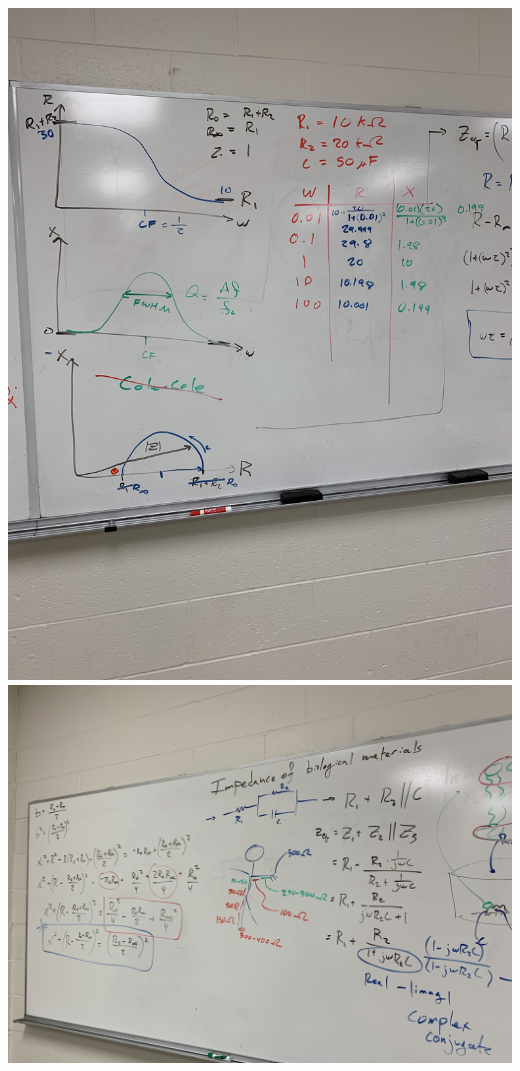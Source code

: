 \documentclass[11pt]{book}
\begin{document}
\includegraphics[width=\textwidth]{figures/4-2-19_Fig.3.jpg}
\\
\includegraphics[width=\textwidth]{figures/4-2-19_Fig.4.jpg}
\\
\end{document}
